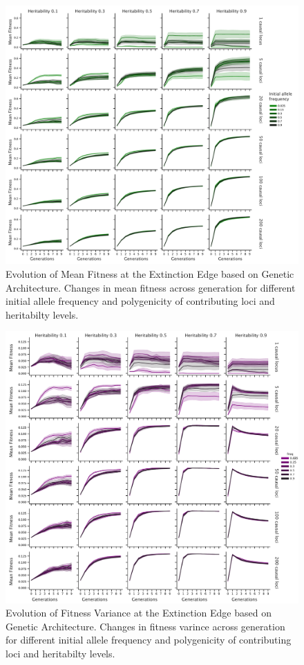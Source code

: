 \documentclass{article}
\begin{document}
\begin{figure}[b]
    \centering
    \includegraphics[width=1\textwidth]{figures/mean_fitness_acrossgen.pdf}
    \caption{Evolution of Mean Fitness at the Extinction Edge based on Genetic Architecture. Changes in mean fitness across generation for different initial allele frequency and polygenicity of contributing loci and heritabilty levels.}
    \label{fig:mean_fitness_acrossgen}
\end{figure}

\begin{figure}[b]
    \centering
    \includegraphics[width=1\textwidth]{figures/var_fitness_across_gen.pdf}
    \caption{Evolution of Fitness Variance at the Extinction Edge based on Genetic Architecture. Changes in fitness varince across generation for different initial allele frequency and polygenicity of contributing loci and heritabilty levels.}
    \label{fig:var_fitness_across_gen}
\end{figure}
\end{document}
